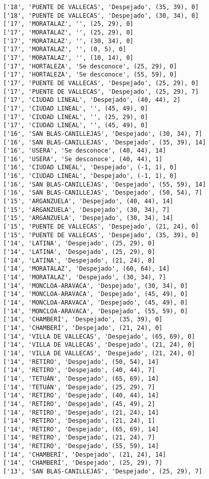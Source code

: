 \documentclass[11pt]{article}
\begin{document}
\begin{Verbatim}[commandchars=\\\{\}]
['18', 'PUENTE DE VALLECAS', 'Despejado', (35, 39), 0]
['18', 'PUENTE DE VALLECAS', 'Despejado', (30, 34), 0]
['17', 'MORATALAZ', '', (25, 29), 0]
['17', 'MORATALAZ', '', (25, 29), 0]
['17', 'MORATALAZ', '', (30, 34), 0]
['17', 'MORATALAZ', '', (0, 5), 0]
['17', 'MORATALAZ', '', (10, 14), 0]
['17', 'HORTALEZA', 'Se desconoce', (25, 29), 0]
['17', 'HORTALEZA', 'Se desconoce', (55, 59), 0]
['17', 'PUENTE DE VALLECAS', 'Despejado', (25, 29), 0]
['17', 'PUENTE DE VALLECAS', 'Despejado', (25, 29), 7]
['17', 'CIUDAD LINEAL', 'Despejado', (40, 44), 2]
['17', 'CIUDAD LINEAL', '', (45, 49), 0]
['17', 'CIUDAD LINEAL', '', (25, 29), 0]
['17', 'CIUDAD LINEAL', '', (45, 49), 0]
['16', 'SAN BLAS-CANILLEJAS', 'Despejado', (30, 34), 7]
['16', 'SAN BLAS-CANILLEJAS', 'Despejado', (35, 39), 14]
['16', 'USERA', 'Se desconoce', (40, 44), 14]
['16', 'USERA', 'Se desconoce', (40, 44), 1]
['16', 'CIUDAD LINEAL', 'Despejado', (-1, 1), 0]
['16', 'CIUDAD LINEAL', 'Despejado', (-1, 1), 0]
['16', 'SAN BLAS-CANILLEJAS', 'Despejado', (55, 59), 14]
['16', 'SAN BLAS-CANILLEJAS', 'Despejado', (50, 54), 7]
['15', 'ARGANZUELA', 'Despejado', (40, 44), 14]
['15', 'ARGANZUELA', 'Despejado', (30, 34), 7]
['15', 'ARGANZUELA', 'Despejado', (30, 34), 14]
['15', 'PUENTE DE VALLECAS', 'Despejado', (21, 24), 0]
['15', 'PUENTE DE VALLECAS', 'Despejado', (35, 39), 0]
['14', 'LATINA', 'Despejado', (25, 29), 0]
['14', 'LATINA', 'Despejado', (25, 29), 0]
['14', 'LATINA', 'Despejado', (21, 24), 0]
['14', 'MORATALAZ', 'Despejado', (60, 64), 14]
['14', 'MORATALAZ', 'Despejado', (30, 34), 7]
['14', 'MONCLOA-ARAVACA', 'Despejado', (30, 34), 0]
['14', 'MONCLOA-ARAVACA', 'Despejado', (45, 49), 0]
['14', 'MONCLOA-ARAVACA', 'Despejado', (45, 49), 0]
['14', 'MONCLOA-ARAVACA', 'Despejado', (55, 59), 0]
['14', 'CHAMBERÍ', 'Despejado', (35, 39), 0]
['14', 'CHAMBERÍ', 'Despejado', (21, 24), 0]
['14', 'VILLA DE VALLECAS', 'Despejado', (65, 69), 0]
['14', 'VILLA DE VALLECAS', 'Despejado', (21, 24), 0]
['14', 'VILLA DE VALLECAS', 'Despejado', (21, 24), 0]
['14', 'RETIRO', 'Despejado', (50, 54), 14]
['14', 'RETIRO', 'Despejado', (40, 44), 7]
['14', 'TETUÁN', 'Despejado', (65, 69), 14]
['14', 'TETUÁN', 'Despejado', (25, 29), 7]
['14', 'RETIRO', 'Despejado', (40, 44), 14]
['14', 'RETIRO', 'Despejado', (45, 49), 2]
['14', 'RETIRO', 'Despejado', (21, 24), 14]
['14', 'RETIRO', 'Despejado', (21, 24), 1]
['14', 'RETIRO', 'Despejado', (65, 69), 14]
['14', 'RETIRO', 'Despejado', (21, 24), 7]
['14', 'RETIRO', 'Despejado', (55, 59), 14]
['14', 'CHAMBERÍ', 'Despejado', (21, 24), 14]
['14', 'CHAMBERÍ', 'Despejado', (25, 29), 7]
['13', 'SAN BLAS-CANILLEJAS', 'Despejado', (25, 29), 7]

\end{Verbatim}
\end{document}
